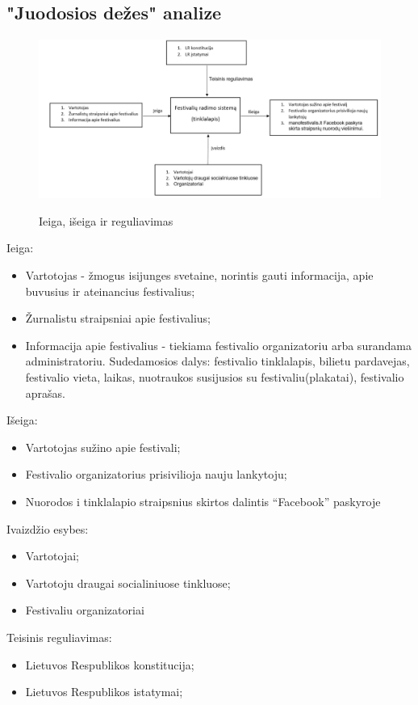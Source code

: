 ﻿\documentclass{VUMIFPSkursinis}
\begin{document}
\subsection{"Juodosios dežes" analize}
\begin{figure}[H]
    \centering
    \includegraphics[scale=0.5]{img/geri/IsorineA}
    \label{img:uml0}
	\caption{Ieiga, išeiga ir reguliavimas}
\end{figure}
\noindent
Ieiga:
\begin{itemize}
\item Vartotojas - žmogus isijunges svetaine, norintis gauti informacija, apie buvusius ir ateinancius festivalius;
\item Žurnalistu straipsniai apie festivalius;
\item Informacija apie festivalius - tiekiama festivalio organizatoriu arba surandama administratoriu. Sudedamosios dalys: festivalio tinklalapis, bilietu pardavejas, festivalio vieta, laikas, nuotraukos susijusios su festivaliu(plakatai), festivalio aprašas.
\end{itemize}
Išeiga:
\begin{itemize}
\item Vartotojas sužino apie festivali;
\item Festivalio organizatorius prisivilioja nauju lankytoju;
\item Nuorodos i tinklalapio straipsnius skirtos dalintis “Facebook” paskyroje
\end{itemize}
Ivaizdžio esybes:
\begin{itemize}
\item Vartotojai;
\item Vartotoju draugai socialiniuose tinkluose;
\item Festivaliu organizatoriai
\end{itemize}
Teisinis reguliavimas:
\begin{itemize}
\item Lietuvos Respublikos konstitucija;
\item Lietuvos Respublikos istatymai;
\end{itemize}
\end{document}
